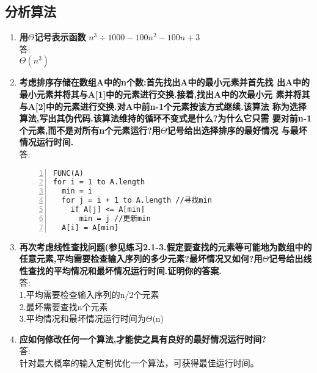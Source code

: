 \subsection{分析算法}
\begin{enumerate} %
\item
\textbf{用$\Theta$记号表示函数} $n^3 \div 1000 - 100n^2 - 100n + 3$\\
答:\\
\hspace*{2 em} $\Theta(n^3)$

\item
\textbf{考虑排序存储在数组A中的n个数:首先找出A中的最小元素并首先找
出A中的最小元素并将其与A[1]中的元素进行交换.接着,找出A中的次最小元
素并将其与A[2]中的元素进行交换.对A中前n-1个元素按该方式继续.该算法
称为选择算法,写出其伪代码.该算法维持的循环不变式是什么?为什么它只需
要对前n-1个元素,而不是对所有n个元素运行?用$\Theta$记号给出选择排序的最好情况
与最坏情况运行时间.}\\
答:
\begin{lstlisting}[numbers=left]
FUNC(A)
for i = 1 to A.length
  min = i
  for j = i + 1 to A.length //寻找min
    if A[j] <= A[min]
      min = j //更新min  
  A[i] = A[min]    
\end{lstlisting}    

    
\item 
\textbf{再次考虑线性查找问题(参见练习2.1-3.假定要查找的元素等可能地为数组中的任意元素,平均需要检查输入序列的多少元素?最坏情况又如何?用$\Theta$记号给出线性查找的平均情况和最坏情况运行时间.证明你的答案.}\\
答:\\
\hspace*{1 em} 1.平均需要检查输入序列的n/2个元素\\
\hspace*{1 em} 2.最坏需要查找n个元素\\
\hspace*{1 em} 3.平均情况和最坏情况运行时间为$\Theta$(n)     

\item
\textbf{应如何修改任何一个算法,才能使之具有良好的最好情况运行时间?}\\
答:\\
\hspace*{1 em} 针对最大概率的输入定制优化一个算法，可获得最佳运行时间。 
\end{enumerate}
